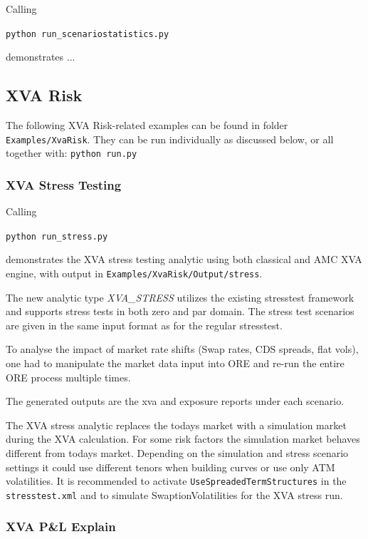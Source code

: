 Calling 

\medskip
\centerline {\tt python run\_scenariostatistics.py} 

\medskip
demonstrates ...

\subsection{XVA Risk}\label{example:xvarisk}

The following XVA Risk-related examples can be found in folder {\tt Examples/XvaRisk}.
They can be run individually as discussed below, or all together with: {\tt python run.py} 

\subsubsection{XVA Stress Testing}\label{example:xvarisk_stress}

Calling

\medskip
\centerline {\tt python run\_stress.py} 

\medskip
demonstrates the XVA stress testing analytic using both classical and AMC XVA engine,
with output in {\tt Examples/XvaRisk/Output/stress}.

The new analytic type \emph{XVA\_STRESS} utilizes the existing stresstest framework and supports
stress tests in both zero and par domain. 
The stress test scenarios are given in the same input format as for the regular stresstest. 

To analyse the impact of market rate shifts (Swap rates, CDS spreads, flat vols), one had to
manipulate the market data input into ORE and re-run the entire ORE process multiple times.

The generated outputs are the xva and exposure reports under each scenario.

The XVA stress analytic replaces the todays market with a simulation market during the XVA calculation.
For some risk factors the simulation market behaves different from todays market.
Depending on the simulation and stress scenario settings it could use different tenors when building curves 
or use only ATM volatilities. It is recommended to activate {\tt UseSpreadedTermStructures} in the
{\tt stresstest.xml} and to simulate SwaptionVolatilities for the XVA stress run.

\subsubsection{XVA P\&L Explain}\label{example:xvarisk_pnl}

